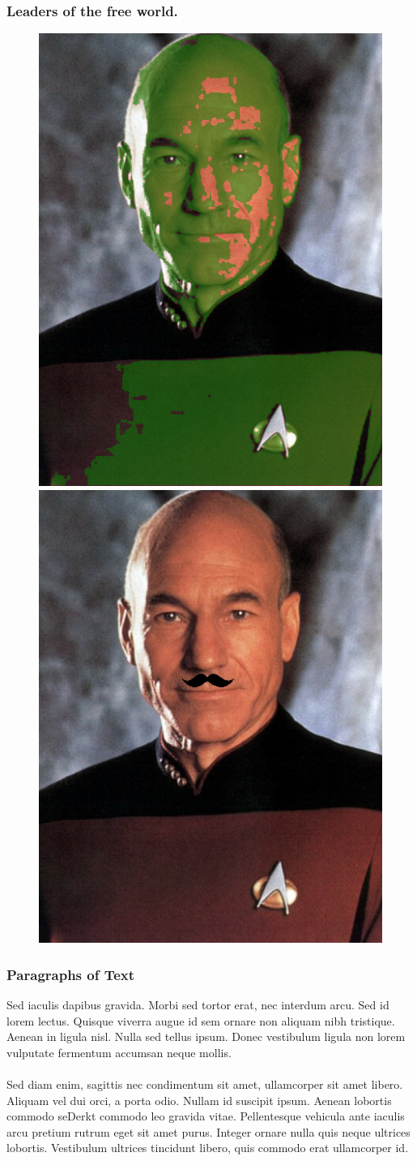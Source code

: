 \documentclass{beamer}
\begin{document}
\begin{frame}
\frametitle{Leaders of the free world.}
 \begin{figure}
     \includegraphics[width=0.4\linewidth]{alien.png}
     \quad
     \includegraphics[width=0.4\linewidth]{psstash.png}
 \end{figure}
\end{frame}
 
 




\begin{frame}
  \frametitle{Paragraphs of Text}
  Sed iaculis dapibus gravida. Morbi sed tortor erat, nec interdum arcu. Sed id lorem lectus. Quisque viverra augue id sem ornare non aliquam nibh tristique. Aenean in ligula nisl. Nulla sed tellus ipsum. Donec vestibulum ligula non lorem vulputate fermentum accumsan neque mollis.\\~\\

  Sed diam enim, sagittis nec condimentum sit amet, ullamcorper sit
  amet libero. Aliquam vel dui orci, a porta odio. Nullam id suscipit
  ipsum. Aenean lobortis commodo seDerkt commodo leo gravida
  vitae. Pellentesque vehicula ante iaculis arcu pretium rutrum eget
  sit amet purus. Integer ornare nulla quis neque ultrices
  lobortis. Vestibulum ultrices tincidunt libero, quis commodo erat
  ullamcorper id.
\end{frame}
\end{document}
